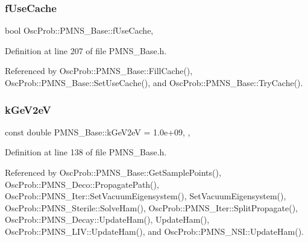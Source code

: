 \mbox{\label{classOscProb_1_1PMNS__Base_ad28c12ef897b5555eda509ea55c99107}} 
\subsubsection{\texorpdfstring{f\+Use\+Cache}{fUseCache}}
{\footnotesize\ttfamily bool Osc\+Prob\+::\+P\+M\+N\+S\+\_\+\+Base\+::f\+Use\+Cache\hspace{0.3cm}{\ttfamily [protected]}, {\ttfamily [inherited]}}



Definition at line 207 of file P\+M\+N\+S\+\_\+\+Base.\+h.



Referenced by Osc\+Prob\+::\+P\+M\+N\+S\+\_\+\+Base\+::\+Fill\+Cache(), Osc\+Prob\+::\+P\+M\+N\+S\+\_\+\+Base\+::\+Set\+Use\+Cache(), and Osc\+Prob\+::\+P\+M\+N\+S\+\_\+\+Base\+::\+Try\+Cache().

\mbox{\label{classOscProb_1_1PMNS__Base_ad36a0a6bf58d6ec093d3947784bd89e9}} 
\subsubsection{\texorpdfstring{k\+Ge\+V2eV}{kGeV2eV}}
{\footnotesize\ttfamily const double P\+M\+N\+S\+\_\+\+Base\+::k\+Ge\+V2eV = 1.\+0e+09\hspace{0.3cm}{\ttfamily [static]}, {\ttfamily [protected]}, {\ttfamily [inherited]}}



Definition at line 138 of file P\+M\+N\+S\+\_\+\+Base.\+h.



Referenced by Osc\+Prob\+::\+P\+M\+N\+S\+\_\+\+Base\+::\+Get\+Sample\+Points(), Osc\+Prob\+::\+P\+M\+N\+S\+\_\+\+Deco\+::\+Propagate\+Path(), Osc\+Prob\+::\+P\+M\+N\+S\+\_\+\+Iter\+::\+Set\+Vacuum\+Eigensystem(), Set\+Vacuum\+Eigensystem(), Osc\+Prob\+::\+P\+M\+N\+S\+\_\+\+Sterile\+::\+Solve\+Ham(), Osc\+Prob\+::\+P\+M\+N\+S\+\_\+\+Iter\+::\+Split\+Propagate(), Osc\+Prob\+::\+P\+M\+N\+S\+\_\+\+Decay\+::\+Update\+Ham(), Update\+Ham(), Osc\+Prob\+::\+P\+M\+N\+S\+\_\+\+L\+I\+V\+::\+Update\+Ham(), and Osc\+Prob\+::\+P\+M\+N\+S\+\_\+\+N\+S\+I\+::\+Update\+Ham().

